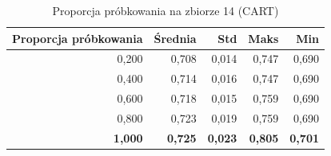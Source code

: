 \begin{table}[htbp]
\centering
\small
\setlength{\tabcolsep}{6pt}
\renewcommand{\arraystretch}{1.2}
\caption{Proporcja próbkowania na zbiorze 14 (CART)}
\label{tab:CART_sample_ratio_14}
\begin{tabular}{r|r|r|r|r}
\toprule
Proporcja próbkowania & Średnia & Std & Maks & Min \\
\hline
0,200 & 0,708 & 0,014 & 0,747 & 0,690 \\
0,400 & 0,714 & 0,016 & 0,747 & 0,690 \\
0,600 & 0,718 & 0,015 & 0,759 & 0,690 \\
0,800 & 0,723 & 0,019 & 0,759 & 0,690 \\
\textbf{1,000} & \textbf{0,725} & \textbf{0,023} & \textbf{0,805} & \textbf{0,701} \\
\bottomrule
\end{tabular}
\end{table}